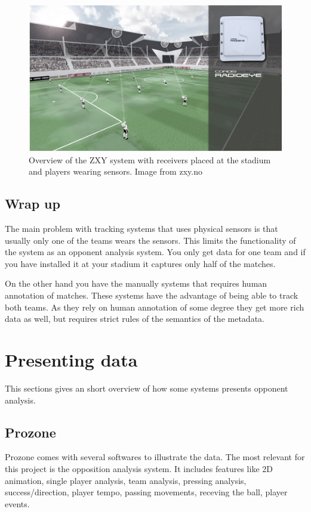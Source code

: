 \begin{figure}[ht!]
\centering
\includegraphics[width=150mm]{images/general/zxyoverview.png}
\caption{Overview of the ZXY system with receivers placed at the stadium and players wearing sensors. Image from zxy.no}
\label{fig:zxycam}
\end{figure}

\subsection{Wrap up}
The main problem with tracking systems that uses physical sensors is that usually only one of the teams wears the sensors. This limits the functionality of the system as an opponent analysis system. You only get data for one team and if you have installed it at your stadium it captures only half of the matches. 

On the other hand you have the manually systems that requires human annotation of matches. These systems have the advantage of being able to track both teams. As they rely on human annotation of some degree they get more rich data as well, but requires strict rules of the semantics of the metadata. 

\section{Presenting data}

This sections gives an short overview of how some systems presents opponent analysis.

\subsection{Prozone}

Prozone comes with several softwares to illustrate the data. The most relevant for this project is the opposition analysis system. It includes features like 2D animation, single player analysis, team analysis, pressing analysis, success/direction, player tempo, passing movements, receving the ball, player events.

